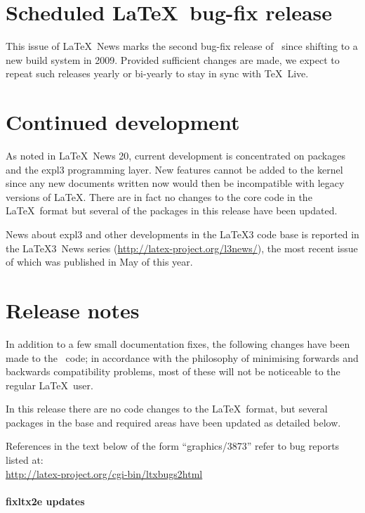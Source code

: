 \documentclass{ltnews}
\begin{document}
\maketitle

\section{Scheduled \LaTeX\ bug-fix release}

This issue of \LaTeX~News marks the second bug-fix release of
\LaTeXe\ since shifting to a new build system in 2009.
Provided sufficient changes are made, we expect to
repeat such releases yearly or bi-yearly to stay in sync with \TeX\ Live.

\section{Continued development}
As noted in \LaTeX\ News 20, current development is concentrated on
packages and the \textsf{expl3} programming layer.
New features cannot be added to the kernel since any new documents
written now would then be incompatible with legacy versions of
\LaTeX. There are in fact no changes to the core code in the \LaTeX\ 
format but several of the packages in this release have been updated.

News about \textsf{expl3} and other developments in the \LaTeX3 code
base is reported in the \LaTeX3~News series
(\url{http://latex-project.org/l3news/}),
the most recent issue of which was published in
May of this year.

\section{Release notes}

In addition to a few small documentation fixes, the following changes
have been made to the \LaTeXe\ code; in accordance with the philosophy
of minimising forwards and backwards compatibility problems, most of
these will not be noticeable to the regular \LaTeX\ user. 

In this release there are no code changes to the \LaTeX\ format, but
several packages in the base and   required areas have been updated as
detailed below.

References in the text below of the form ``graphics/3873'' refer to
bug reports listed
at:\\ \url{http://latex-project.org/cgi-bin/ltxbugs2html}


\paragraph{\textsf{fixltx2e} updates}
\end{document}
